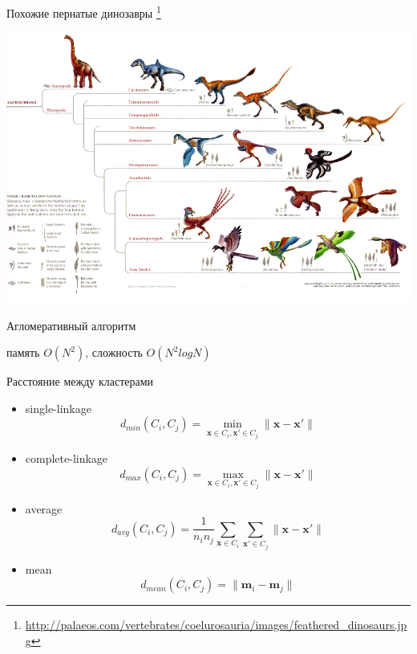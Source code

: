 \documentclass[aspectratio=169]{beamer}
\begin{document}
\begin{frame}{Похожие пернатые динозавры \footnote{\url{http://palaeos.com/vertebrates/coelurosauria/images/feathered_dinosaurs.jpg}}}

\begin{center}
\includegraphics[height=0.8\textheight]{images/dinosaurs.jpg}
\end{center}

\end{frame}

\begin{frame}{Агломеративный алгоритм}

\begin{small}
\hier
\end{small}
память $O(N^2)$, сложность $O(N^2 log N)$

\end{frame}

\begin{frame}{Расстояние между кластерами}

\begin{itemize}
\item single-linkage
\[
d_{min}(C_i, C_j) = \min_{\mathbf{x} \in C_i, \mathbf{x}' \in C_j} \|\mathbf{x} -\mathbf{x}' \|
\]
\item complete-linkage
\[
d_{max}(C_i, C_j) = \max_{\mathbf{x} \in C_i, \mathbf{x}' \in C_j} \|\mathbf{x} -\mathbf{x}' \|
\]
\item average
\[
d_{avg}(C_i, C_j) = \frac{1}{n_i n_j}\sum_{\mathbf{x} \in C_i}\sum_{\mathbf{x}' \in C_j} \|\mathbf{x} -\mathbf{x}' \|
\]
\item mean
\[
d_{mean}(C_i, C_j) = \|\mathbf{m}_i -\mathbf{m}_j \|
\]
\end{itemize}

\end{frame}
\end{document}
